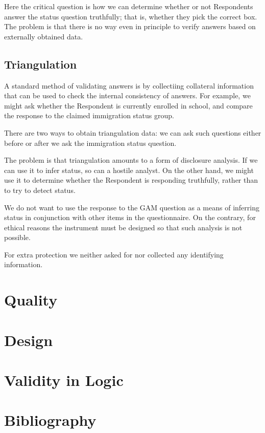 \documentclass[11pt,twoside]{article}
\newcommand{\R}{Respondent}
\begin{document}
Here the critical question is how we can determine whether or not
\R{}s answer the status question truthfully; that is, whether they
pick the correct box.  The problem is that there is no way even in
principle to verify answers based on externally obtained data.

\subsection{Triangulation}

A standard method of validating answers is by collectiing collateral
information that can be used to check the internal consistency of
answers.  For example, we might ask whether the \R{} is currently
enrolled in school, and compare the response to the claimed
immigration status group.

There are two ways to obtain triangulation data: we can ask such
questions either before or after we ask the immigration status
question.

The problem is that triangulation amounts to a form of disclosure
analysis.  If we can use it to infer status, so can a hostile analyst.
On the other hand, we might use it to determine whether the \R{} is
responding truthfully, rather than to try to detect status.

We do not want to use the response to the GAM question as a means of
inferring status in conjunction with other items in the questionnaire.
On the contrary, for ethical reasons the instrument must be designed
so that such analysis is not possible.

For extra protection we neither asked for nor collected any identifying information.

\section{Quality}

\section{Design}

\clearpage
\begin{appendices}
\section{Validity in Logic}
\section{Bibliography}
\printbibliography[heading=none]
\end{appendices}
\end{document}

